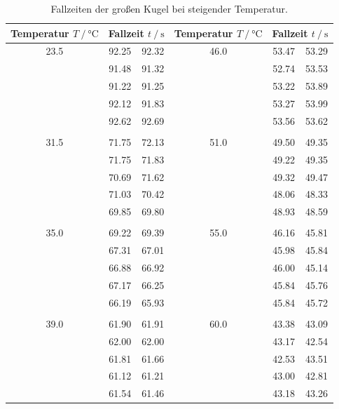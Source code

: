 \begin{table}[h]
    \centering
    \caption{Fallzeiten der großen Kugel bei steigender Temperatur.}
    \label{tab:mess_grKugel_dyn}
    \begin{tabular}{c c c c c c}
        \toprule
        {Temperatur $T\:/\:\si{\celsius}$} & \multicolumn{2}{c}{Fallzeit $t\:/\:\si{\second}$} & {Temperatur $T\:/\:\si{\celsius}$} & \multicolumn{2}{c}{Fallzeit $t\:/\:\si{\second}$} \\
        \midrule
        23.5 & 92.25 & 92.32 & 46.0 & 53.47 & 53.29 \\
             & 91.48 & 91.32 &      & 52.74 & 53.53 \\
             & 91.22 & 91.25 &      & 53.22 & 53.89 \\
             & 92.12 & 91.83 &      & 53.27 & 53.99 \\
             & 92.62 & 92.69 &      & 53.56 & 53.62 \\
                                                    \\
        31.5 & 71.75 & 72.13 & 51.0 & 49.50 & 49.35 \\
             & 71.75 & 71.83 &      & 49.22 & 49.35 \\
             & 70.69 & 71.62 &      & 49.32 & 49.47 \\
             & 71.03 & 70.42 &      & 48.06 & 48.33 \\
             & 69.85 & 69.80 &      & 48.93 & 48.59 \\
                                                    \\
        35.0 & 69.22 & 69.39 & 55.0 & 46.16 & 45.81 \\
             & 67.31 & 67.01 &      & 45.98 & 45.84 \\
             & 66.88 & 66.92 &      & 46.00 & 45.14 \\
             & 67.17 & 66.25 &      & 45.84 & 45.76 \\
             & 66.19 & 65.93 &      & 45.84 & 45.72 \\
                                                    \\
        39.0 & 61.90 & 61.91 & 60.0 & 43.38 & 43.09 \\
             & 62.00 & 62.00 &      & 43.17 & 42.54 \\
             & 61.81 & 61.66 &      & 42.53 & 43.51 \\
             & 61.12 & 61.21 &      & 43.00 & 42.81 \\
             & 61.54 & 61.46 &      & 43.18 & 43.26 \\

\end{tabular}
\end{table}

